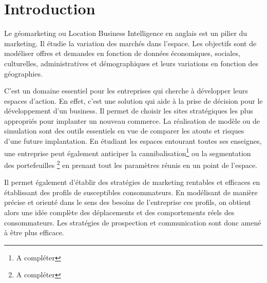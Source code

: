 \documentclass{themeensg}
\begin{document}
  \begin{acronym}
  \end{acronym}


\chapter*{Introduction}

Le géomarketing ou Location Business Intelligence en anglais est un pilier du marketing. Il étudie la variation des marchés dans l’espace. Les objectifs sont de modéliser offres et demandes en fonction de données économiques, sociales, culturelles, administratives et démographiques et leurs variations en fonction des géographies.

C’est un domaine essentiel pour les entreprises qui cherche à développer leurs espaces d’action. En effet, c’est une solution qui aide à la prise de décision pour le développement d’un business. Il permet de choisir les sites stratégiques les plus appropriés pour implanter un nouveau commerce. La réalisation de modèle ou de simulation sont des outils essentiels en vue de comparer les atouts et risques d’une future implantation. En étudiant les espaces entourant toutes ses enseignes, une entreprise peut également anticiper la cannibalisation\footnote{A compléter} ou la segmentation des portefeuilles \footnote{A compléter} en prenant tout les paramètres réunis en un point de l’espace.

Il permet également d’établir des stratégies de marketing rentables et efficaces en établissant des profils de susceptibles consommateurs. En modélisant de manière précise et orienté dans le sens des besoins de l’entreprise ces profils, on obtient alors une idée complète des déplacements et des comportements réels des consommateurs. Les stratégies de prospection et communication sont donc amené à être plus efficace.
\end{document}
